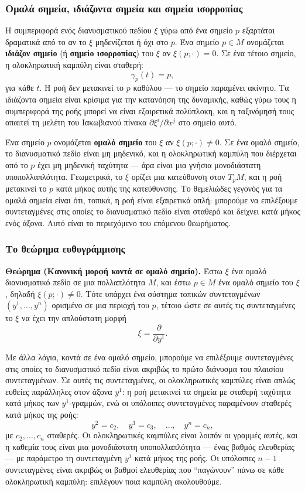 \documentclass[11pt,a4paper,twoside,openright]{book}
\begin{document}
\subsubsection{Ομαλά σημεία, ιδιάζοντα σημεία και σημεία ισορροπίας}

Η συμπεριφορά ενός διανυσματικού πεδίου $\xi$ γύρω από ένα σημείο $p$ εξαρτάται δραματικά από το αν το $\xi$ μηδενίζεται ή όχι στο $p$. Ένα σημείο $p \in M$ ονομάζεται \textbf{ιδιάζον σημείο} (ή \textbf{σημείο ισορροπίας}) του $\xi$ αν $\xi(p; \cdot) = 0$. Σε ένα τέτοιο σημείο, η ολοκληρωτική καμπύλη είναι σταθερή:
\[
\gamma_p(t) = p,
\]
για κάθε $t$. Η ροή δεν μετακινεί το $p$ καθόλου --- το σημείο παραμένει ακίνητο. Τα ιδιάζοντα σημεία είναι κρίσιμα για την κατανόηση της δυναμικής, καθώς γύρω τους η συμπεριφορά της ροής μπορεί να είναι εξαιρετικά πολύπλοκη, και η ταξινόμησή τους απαιτεί τη μελέτη του Ιακωβιανού πίνακα $\partial \xi^i / \partial x^j$ στο σημείο αυτό.

Ένα σημείο $p$ ονομάζεται \textbf{ομαλό σημείο} του $\xi$ αν $\xi(p; \cdot) \neq 0$. Σε ένα ομαλό σημείο, το διανυσματικό πεδίο είναι μη μηδενικό, και η ολοκληρωτική καμπύλη που διέρχεται από το $p$ έχει μη μηδενική ταχύτητα --- άρα είναι μια γνήσια μονοδιάστατη υποπολλαπλότητα. Γεωμετρικά, το $\xi$ ορίζει μια κατεύθυνση στον $T_pM$, και η ροή μετακινεί το $p$ κατά μήκος αυτής της κατεύθυνσης. Το θεμελιώδες γεγονός για τα ομαλά σημεία είναι ότι, τοπικά, η ροή είναι εξαιρετικά απλή: μπορούμε να επιλέξουμε συντεταγμένες στις οποίες το διανυσματικό πεδίο είναι σταθερό και δείχνει κατά μήκος ενός άξονα. Αυτό είναι το περιεχόμενο του επόμενου θεωρήματος.

\subsubsection{Το θεώρημα ευθυγράμμισης}

\textbf{Θεώρημα (Κανονική μορφή κοντά σε ομαλό σημείο).} Έστω $\xi$ ένα ομαλό διανυσματικό πεδίο σε μια πολλαπλότητα $M$, και έστω $p \in M$ ένα ομαλό σημείο του $\xi$, δηλαδή $\xi(p; \cdot) \neq 0$. Τότε υπάρχει ένα σύστημα τοπικών συντεταγμένων $(y^1, \dots, y^n)$ ορισμένο σε μια περιοχή του $p$, τέτοιο ώστε σε αυτές τις συντεταγμένες το $\xi$ να έχει την απλούστατη μορφή
\[
\xi = \frac{\partial}{\partial y^1}. \tag{0.22}
\]

Με άλλα λόγια, κοντά σε ένα ομαλό σημείο, μπορούμε να επιλέξουμε συντεταγμένες στις οποίες το διανυσματικό πεδίο είναι ακριβώς το πρώτο διάνυσμα του πλαισίου συντεταγμένων. Σε αυτές τις συντεταγμένες, οι ολοκληρωτικές καμπύλες είναι απλώς ευθείες παράλληλες στον άξονα $y^1$: η ροή μετακινεί τα σημεία με σταθερή ταχύτητα κατά μήκος των $y^1$-γραμμών, ενώ οι υπόλοιπες συντεταγμένες παραμένουν σταθερές κατά μήκος της ροής:
\[
y^2 = c_2, \quad y^3 = c_3, \quad \dots, \quad y^n = c_n,
\]
με $c_2, \dots, c_n$ σταθερές. Οι ολοκληρωτικές καμπύλες είναι λοιπόν οι γραμμές αυτές, και η καθεμία τους είναι μια μονοδιάστατη υποπολλαπλότητα --- ένας βαθμός ελευθερίας --- με παράμετρο τη συντεταγμένη $y^1$ κατά μήκος της ροής. Οι υπόλοιπες $n-1$ συντεταγμένες είναι ακριβώς οι βαθμοί ελευθερίας που ``παγώνουν'' πάνω σε κάθε ολοκληρωτική καμπύλη: επιλέγουν ποια καμπύλη ακολουθούμε.
\end{document}

